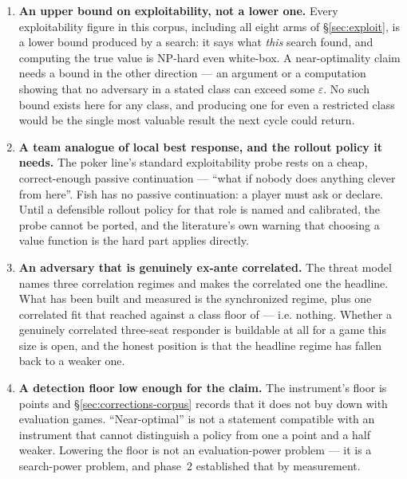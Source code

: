 \begin{enumerate}

\item \textbf{An upper bound on exploitability, not a lower one.} Every exploitability figure in this
  corpus, including all eight arms of \S\ref{sec:exploit}, is a lower bound produced by a search: it
  says what \emph{this} search found, and computing the true value is NP-hard even white-box. A
  near-optimality claim needs a bound in the other direction --- an argument or a computation showing
  that no adversary in a stated class can exceed some $\varepsilon$. No such bound exists here for any
  class, and producing one for even a restricted class would be the single most valuable result the
  next cycle could return.

\item \textbf{A team analogue of local best response, and the rollout policy it needs.} The
  poker line's standard exploitability probe rests on a cheap, correct-enough passive continuation ---
  ``what if nobody does anything clever from here''. Fish has no passive continuation: a player must
  ask or declare. Until a defensible rollout policy for that role is named and calibrated, the probe
  cannot be ported, and the literature's own warning that choosing a value function is the hard part
  applies directly.

\item \textbf{An adversary that is genuinely ex-ante correlated.} The threat model names three
  correlation regimes and makes the correlated one the headline. What has been built and measured is
  the synchronized regime, plus one correlated fit that reached \vsevenCorrelatedFit{} against a class
  floor of \vsevenCorrelatedFloor{} --- i.e. nothing. Whether a genuinely correlated three-seat
  responder is buildable at all for a game this size is open, and the honest position is that the
  headline regime has fallen back to a weaker one.

\item \textbf{A detection floor low enough for the claim.} The instrument's floor is
  \vsevenPrimaryFloor{} points and \S\ref{sec:corrections-corpus} records that it does not buy down
  with evaluation games. ``Near-optimal'' is not a statement compatible with an instrument that cannot
  distinguish a policy from one a point and a half weaker. Lowering the floor is not an evaluation-power
  problem --- it is a search-power problem, and phase~2 established that by measurement.


\end{enumerate}
